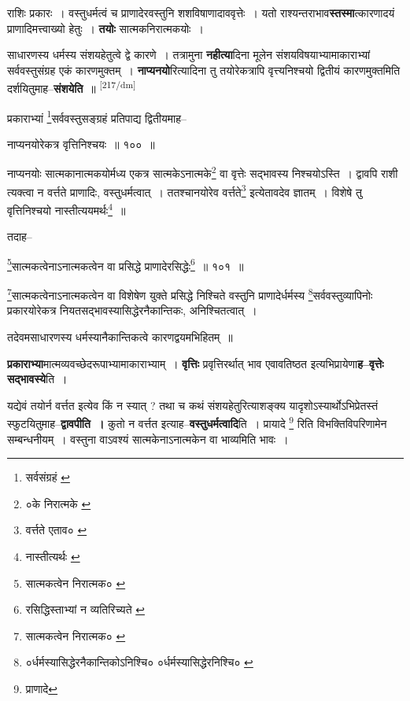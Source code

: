 \documentclass[article,12pt,a4paper]{memoir}
\begin{document}
	  \pstart राशिः प्रकारः । वस्तुधर्मत्वं च प्राणादेरवस्तुनि शशविषाणादाववृत्तेः । यतो राश्यन्तराभाव\textbf{स्तस्मा}त्कारणादयं प्राणादिमत्त्वाख्यो हेतुः । \textbf{तयोः} सात्मकनिरात्मकयोः ।
	\pend
      

	  \pstart साधारणस्य धर्मस्य संशयहेतुत्वे द्वे कारणे । तत्रामुना \textbf{नहीत्या}दिना मूलेन संशयविषयाभ्यामाकाराभ्यां सर्ववस्तुसंग्रह एकं कारणमुक्तम् । \textbf{नाप्यनयो}रित्यादिना तु तयोरेकत्रापि वृत्त्यनिश्चयो द्वितीयं कारणमुक्तमिति दर्शयितुमाह--\textbf{संशयेति} ॥
	\pend
      \leavevmode\textsuperscript{\rmlatinfont\tiny [217/dm]}

	  \pstart प्रकाराभ्यां \footnote{सर्वसंग्रहं \cite{dp-msA} \cite{dp-msB} \cite{dp-msC} \cite{dp-edP} \cite{dp-edH} \cite{dp-edE} \cite{dp-edN}}सर्ववस्तुसङ्ग्रहं प्रतिपाद्य द्वितीयमाह--
	\pend
       

	  \pstart नाप्यनयोरेकत्र वृत्तिनिश्चयः ॥ १०० ॥
	\pend
       

	  \pstart नाप्यनयोः सात्मकानात्मकयोर्मध्य एकत्र सात्मकेऽनात्मके\footnote{०के निरात्मके \cite{dp-msC}} वा वृत्तेः सद्भावस्य निश्चयोऽस्ति । द्वावपि राशी त्यक्त्वा न वर्त्तते प्राणादिः, वस्तुधर्मत्वात् । ततश्चानयोरेव वर्त्तते\footnote{वर्त्तते एताव० \cite{dp-msC}} इत्येतावदेव ज्ञातम् । विशेषे तु वृत्तिनिश्चयो नास्तीत्ययमर्थः\footnote{नास्तीत्यर्थः \cite{dp-msC} \cite{dp-msD}} ॥
	\pend
       

	  \pstart तदाह--
	\pend
       

	  \pstart \footnote{सात्मकत्वेन निरात्मक० \cite{dp-msB} \cite{dp-edP} \cite{dp-edH} \cite{dp-edE} \cite{dp-edN}}सात्मकत्वेनाऽनात्मकत्वेन वा प्रसिद्धे प्राणादेरसिद्धेः\footnote{रसिद्धिस्ताभ्यां न व्यतिरिच्यते \cite{dp-edE}} ॥ १०१ ॥
	\pend
       

	  \pstart \footnote{सात्मकत्वेन निरात्मक० \cite{dp-msD}}सात्मकत्वेनाऽनात्मकत्वेन वा विशेषेण युक्ते प्रसिद्धे निश्चिते वस्तुनि प्राणादेर्धर्मस्य \footnote{०र्धर्मस्यासिद्धेरनैकान्तिकोऽनिश्चि० \cite{dp-msA} \cite{dp-msB} \cite{dp-edP} \cite{dp-edH} \cite{dp-edE} \cite{dp-edN} ०र्धर्मस्यासिद्धेरनिश्चि० \cite{dp-msC}}सर्ववस्तुव्यापिनोः प्रकारयोरेकत्र नियतसद्भावस्यासिद्धेरनैकान्तिकः, अनिश्चितत्वात् ।
	\pend
       

	  \pstart तदेवमसाधारणस्य धर्मस्यानैकान्तिकत्वे कारणद्वयमभिहितम् ॥
	\pend
      

	  \pstart \textbf{प्रकाराभ्या}मात्मव्यवच्छेदरूपाभ्यामाकाराभ्याम् । \textbf{वृत्तिः} प्रवृत्तिरर्थात् भाव एवावतिष्ठत इत्यभिप्रायेणा\textbf{ह--वृत्तेः सद्भावस्ये}ति ।
	\pend
      

	  \pstart यद्येवं तयोर्न वर्त्तत इत्येव किं न स्यात् ? तथा च कथं संशयहेतुरित्याशङ्क्य यादृशोऽस्यार्थोऽभिप्रेतस्तं स्फुटयितुमाह--\textbf{द्वावपीति ।} कुतो न वर्त्तत इत्याह--\textbf{वस्तुधर्मत्वादि}ति । प्रायादे \footnote{प्राणादे} रिति विभक्तिविपरिणामेन सम्बन्धनीयम् । वस्तुना वाऽवश्यं सात्मकेनाऽनात्मकेन वा भाव्यमिति भावः ।
	\pend
      
\end{document}
